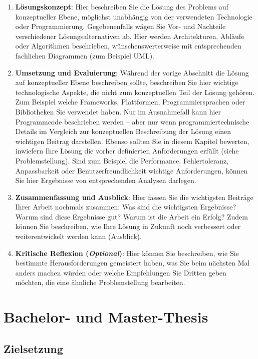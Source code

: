 \begin{enumerate}
    \item \label{struktur:loesungskonzept} \textbf{Lösungskonzept}: Hier beschreiben Sie die Lösung des Problems auf konzeptueller Ebene, möglichst unabhängig von der verwendeten Technologie oder Programmierung. Gegebenenfalls wägen Sie Vor- und Nachteile verschiedener Lösungsalternativen ab. Hier werden Architekturen, Abläufe oder Algorithmen beschrieben, wünschenswerterweise mit entsprechenden fachlichen Diagrammen (zum Beispiel UML).
    \item \label{struktur:umsetzung-und-evaluierung} \textbf{Umsetzung und Evaluierung}: Während der vorige Abschnitt die Lösung auf konzeptueller Ebene beschreiben sollte, beschreiben Sie hier wichtige technologische Aspekte, die nicht zum konzeptuellen Teil der Lösung gehören. Zum Beispiel welche Frameworks, Plattformen, Programmiersprachen oder Bibliotheken Sie verwendet haben. Nur im Ausnahmefall kann hier Programmcode beschrieben werden -- aber nur wenn programmiertechnische Details im Vergleich zur konzeptuellen Beschreibung der Lösung einen wichtigen Beitrag darstellen. Ebenso sollten Sie in diesem Kapitel bewerten, inwiefern Ihre Lösung die vorher definierten Anforderungen erfüllt (siehe Problemstellung). Sind zum Beispiel die Performance, Fehlertoleranz, Anpassbarkeit oder Benutzerfreundlichkeit wichtige Anforderungen, können Sie hier Ergebnisse von entsprechenden Analysen darlegen.
    \item \label{struktur:zusammenfassung-ausblick} \textbf{Zusammenfassung und Ausblick}: Hier fassen Sie die wichtigsten Beiträge Ihrer Arbeit nochmals zusammen: Was sind die wichtigsten Ergebnisse? Warum sind diese Ergebnisse gut? Warum ist die Arbeit ein Erfolg? Zudem können Sie beschreiben, wie Ihre Lösung in Zukunft noch verbessert oder weiterentwickelt werden kann (Ausblick). 
    \item \textbf{Kritische Reflexion (\textit{Optional})}: Hier können Sie beschreiben, wie Sie bestimmte Herausforderungen gemeistert haben, was Sie beim nächsten Mal anders machen würden oder welche Empfehlungen Sie Dritten geben möchten, die eine ähnliche Problemstellung bearbeiten.
\end{enumerate}


\section{Bachelor- und Master-Thesis}

\subsection{Zielsetzung}

